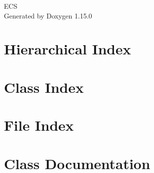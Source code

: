 \documentclass[twoside]{book}
\newcommand{\+}{\discretionary{\mbox{\scriptsize$\hookleftarrow$}}{}{}}
\newcommand{\clearemptydoublepage}{%
    \newpage{\pagestyle{empty}\cleardoublepage}%
  }
\begin{document}
  \raggedbottom
    \hypersetup{pageanchor=false,
                bookmarksnumbered=true,
                pdfencoding=unicode
               }
  \begin{titlepage}
  \vspace*{7cm}
  \begin{center}%
  {\Large ECS}\\
  \vspace*{1cm}
  {\large Generated by Doxygen 1.15.0}\\
  \end{center}
  \end{titlepage}
  \clearemptydoublepage
  \tableofcontents
  \clearemptydoublepage
  \hypersetup{pageanchor=true}
\chapter{Hierarchical Index}

\chapter{Class Index}

\chapter{File Index}

\chapter{Class Documentation}



























\end{document}
